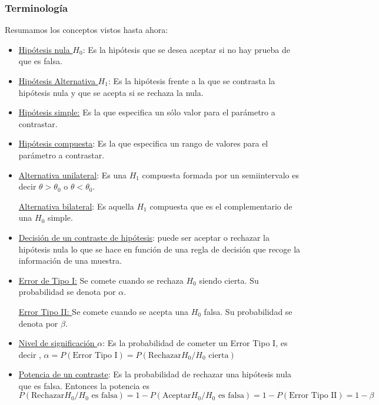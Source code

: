 \documentclass[12pt]{report}
\begin{document}
\subsubsection{Terminología} Resumamos los conceptos vistos hasta
ahora:
\begin{itemize}
\item \underline{Hipótesis nula $H_{0}$}: Es la hipótesis que se desea aceptar si no hay prueba
de que es falsa.

\item \underline{Hipótesis Alternativa $H_{1}$}: Es la hipótesis frente a la que se contrasta
la hipótesis nula y que se acepta si se rechaza la nula.

\item \underline{Hipótesis simple:} Es la que especifica un sólo valor para el parámetro a
contrastar.

\item \underline{Hipótesis compuesta}:  Es la que especifica un rango de valores para el
parámetro a contrastar.

\item \underline{Alternativa unilateral}: Es una $H_{1}$ compuesta formada por un semiintervalo
es decir $\theta>\theta_{0}$ o $\theta<\theta_{0}$.

\underline{Alternativa bilateral}:   Es aquella $H_{1}$ compuesta que es el
complementario de una $H_{0}$ simple.

\item \underline{Decisión de un contraste de hipótesis}: puede ser aceptar o rechazar la
hipótesis nula lo que se hace en función de una regla de decisión que recoge la
información de una muestra.

\item \underline{Error de Tipo I:} Se comete cuando se rechaza $H_{0}$ siendo cierta. Su
probabilidad se denota por $\alpha$.

\underline{Error Tipo II: }Se comete cuando se acepta una $H_{0}$ falsa. Su probabilidad
se denota por $\beta$.

\item \underline{Nivel de significación $\alpha$}: Es la probabilidad de cometer un
 Error Tipo I, es decir , 
  $\alpha=P(\mbox{Error Tipo I})=P(\mbox{Rechazar} H_{0}/H_{0}
\mbox{ cierta})$

\item \underline{Potencia de un contraste}: Es la probabilidad de rechazar una hipótesis nula que
es falsa. Entonces la potencia es $$P(\mbox{Rechazar} H_{0}/ H_{0}\mbox{ es falsa})=
1-P(\mbox{Aceptar} H_{0}/ H_{0}\mbox{ es falsa})= 1-P(\mbox{Error Tipo II})=1-\beta$$
\end{itemize}
\end{document}

